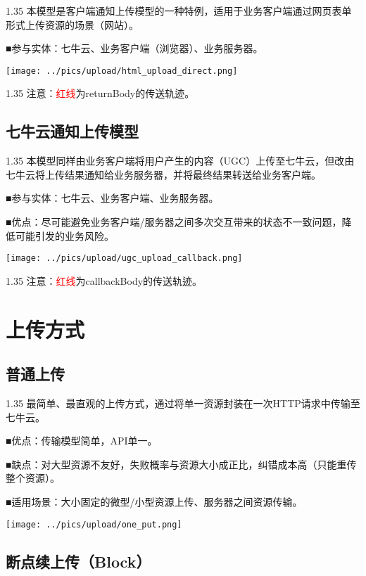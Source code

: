 \documentclass[11pt, oneside]{book}
\newcommand{\qpara}[1]{
\vspace{0.2em}
\begin{spacing}{1.35}
\noindent
#1\par
\end{spacing}
\vspace{0.2em}
}
\newcommand{\qblock}[1]{
\vspace{0.1em}
\noindent
#1\par
\vspace{0.1em}
}
\begin{document}
\qpara{本模型是客户端通知上传模型的一种特例，适用于业务客户端通过网页表单形式上传资源的场景（网站）。}
\qblock{■\thinspace 参与实体：七牛云、业务客户端（浏览器）、业务服务器。}

\begin{center}
\texttt{[image: ../pics/upload/html\_upload\_direct.png]}
\end{center}

\qpara{注意：\textcolor{red}{红线}为returnBody的传送轨迹。}

\clearpage

\section{七牛云通知上传模型}

\qpara{本模型同样由业务客户端将用户产生的内容（UGC）上传至七牛云，但改由七牛云将上传结果通知给业务服务器，并将最终结果转送给业务客户端。}
\qblock{■\thinspace 参与实体：七牛云、业务客户端、业务服务器。}
\qblock{■\thinspace 优点：尽可能避免业务客户端/服务器之间多次交互带来的状态不一致问题，降低可能引发的业务风险。}

\begin{center}
\texttt{[image: ../pics/upload/ugc\_upload\_callback.png]}
\end{center}

\qpara{注意：\textcolor{red}{红线}为callbackBody的传送轨迹。}

\chapter{上传方式}

\section{普通上传}

\qpara{最简单、最直观的上传方式，通过将单一资源封装在一次HTTP请求中传输至七牛云。}
\qblock{■\thinspace 优点：传输模型简单，API单一。}
\qblock{■\thinspace 缺点：对大型资源不友好，失败概率与资源大小成正比，纠错成本高（只能重传整个资源）。}
\qblock{■\thinspace 适用场景：大小固定的微型/小型资源上传、服务器之间资源传输。}

\begin{center}
\texttt{[image: ../pics/upload/one\_put.png]}
\end{center}

\section{断点续上传（Block）}
\end{document}
